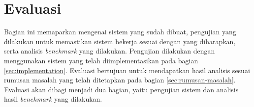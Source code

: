 \section{Evaluasi}
\label{sec:evaluasi}

Bagian ini memaparkan mengenai sistem yang sudah dibuat, pengujian yang dilakukan untuk memastikan sistem bekerja sesuai dengan yang diharapkan, serta analisis \textit{benchmark} yang dilakukan. Pengujian dilakukan dengan menggunakan sistem yang telah diimplementasikan pada bagian \ref{sec:implementation}. Evaluasi bertujuan untuk mendapatkan hasil analisis sesuai rumusan masalah yang telah ditetapkan pada bagian \ref{sec:rumusan-masalah}. Evaluasi akan dibagi menjadi dua bagian, yaitu pengujian sistem dan analisis hasil \textit{benchmark} yang dilakukan.


